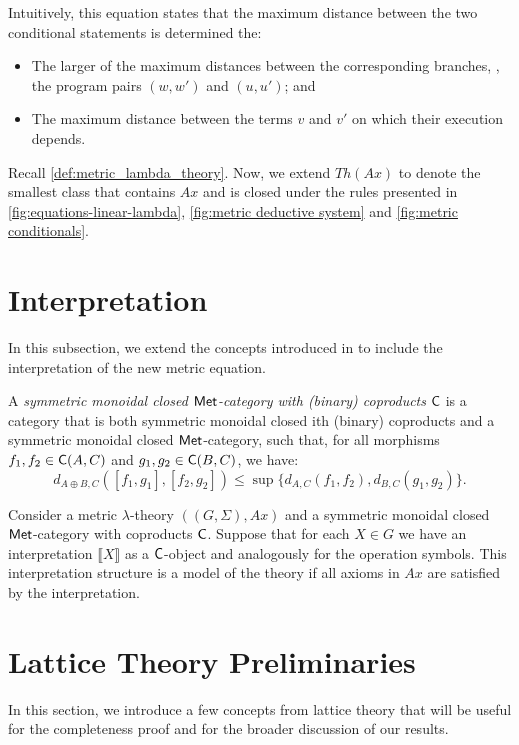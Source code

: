 Intuitively, this equation states that the maximum distance between the two conditional statements is determined the:

\begin{itemize}
    \item The larger of the maximum distances between the corresponding branches, \ie, the program pairs $(w, w')$ and $(u, u')$; and
    \item The maximum distance between the terms $v$ and $v'$ on which their execution depends.
\end{itemize}


Recall \autoref{def:metric_lambda_theory}. Now, we extend \( Th(Ax) \) to denote the smallest class that contains \( Ax \) and is closed under the rules presented in \autoref{fig:equations-linear-lambda}, \autoref{fig:metric deductive system} and \autoref{fig:metric conditionals}.


\section{Interpretation}

In this subsection, we extend the concepts introduced in  to include the interpretation of the new metric equation.

\begin{definition}
  A \emph{symmetric monoidal closed $\mathsf{Met}$-category with (binary) coproducts} $\mathsf{C}$ is a category that is both symmetric monoidal closed ith (binary) coproducts  and a symmetric monoidal closed $\mathsf{Met}$‑category, such that, for all morphisms $f_1, f_2 \in \mathsf{C}(A, C)$ and $g_1, g_2 \in \mathsf{C}(B, C)$, we have:
\[
  d_{A \oplus B, C}([f_1, g_1], [f_2, g_2]) \leq \sup \{d_{A,C}(f_1, f_2), d_{B,C}(g_1, g_2)\}.
\]
\end{definition}


\begin{definition}
  Consider a metric $\lambda$-theory $((G,\Sigma),Ax)$ and a symmetric monoidal closed $\mathsf{Met}$-category with coproducts $\mathsf{C}$. Suppose that for each $X \in G$ we have an interpretation $\llbracket X \rrbracket$ as a $\mathsf{C}$-object and analogously for the operation symbols. This interpretation structure is a model of the theory if all axioms in $Ax$ are satisfied by the interpretation.
\end{definition}



\section{Lattice Theory Preliminaries}
In this section, we introduce a few concepts from lattice theory that will be useful for the completeness proof and for the broader discussion of our results.


